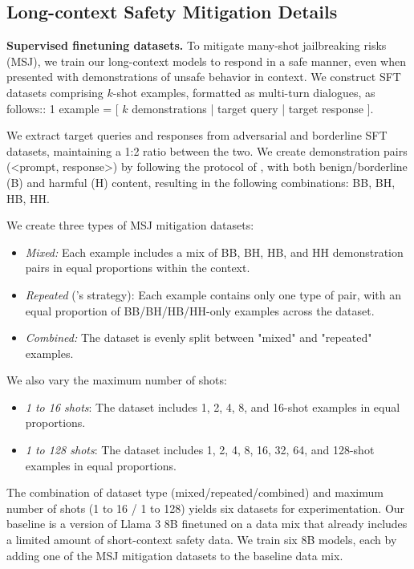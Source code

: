
\subsection{Long-context Safety Mitigation Details} \label{app:lc_safety_mitigation}

\textbf{Supervised finetuning datasets.}
To mitigate many-shot jailbreaking risks (MSJ), we train our long-context models to respond in a safe manner, even when presented with demonstrations of unsafe behavior in context. We construct SFT datasets comprising $k$-shot examples, formatted as multi-turn dialogues, as follows:: 1 example = [ $k$ demonstrations | target query | target response ].

We extract target queries and responses from adversarial and borderline SFT datasets, maintaining a 1:2 ratio between the two. We create demonstration pairs (<prompt, response>) by following the protocol of \cite{anil2024many}, with both benign/borderline (B) and harmful (H) content, resulting in the following combinations: BB, BH, HB, HH.

We create three types of MSJ mitigation datasets:
\begin{itemize}
    \item \textit{Mixed:} Each example includes a mix of BB, BH, HB, and HH demonstration pairs in equal proportions within the context.
    \item \textit{Repeated }(\cite{anil2024many}'s strategy): Each example contains only one type of pair, with an equal proportion of BB/BH/HB/HH-only examples across the dataset.
    \item \textit{Combined: } The dataset is evenly split between "mixed" and "repeated" examples.
\end{itemize}
We also vary the maximum number of shots:
\begin{itemize}
    \item \textit{1 to 16 shots}: The dataset includes 1, 2, 4, 8, and 16-shot examples in equal proportions.
    \item \textit{1 to 128 shots}: The dataset includes 1, 2, 4, 8, 16, 32, 64, and 128-shot examples in equal proportions.
\end{itemize}
The combination of dataset type (mixed/repeated/combined) and maximum number of shots (1 to 16 / 1 to 128) yields six datasets for experimentation. Our baseline is a version of Llama 3 8B finetuned on a data mix that already includes a limited amount of short-context safety data. We train six 8B models, each by adding one of the MSJ mitigation datasets to the baseline data mix.

